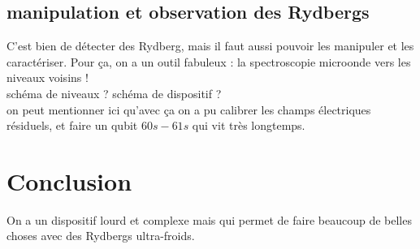 	\subsection{manipulation et observation des Rydbergs}
\noindent C'est bien de détecter des Rydberg, mais il faut aussi pouvoir les manipuler et les caractériser.
Pour ça, on a un outil fabuleux : la spectroscopie microonde vers les niveaux voisins ! \\
schéma de niveaux ? schéma de dispositif ? \\
on peut mentionner ici qu'avec ça on a pu calibrer les champs électriques résiduels, et faire un qubit $60s-61s$ qui vit très longtemps.

\section*{Conclusion}
On a un dispositif lourd et complexe mais qui permet de faire beaucoup de belles choses avec des Rydbergs ultra-froids.